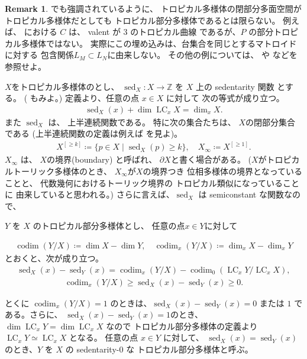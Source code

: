 \documentclass[a4paper,dvipdfmx,reqno,12pt]{amsart}
\theoremstyle{definition}
\newtheorem{remark}[theorem]{Remark}
\newcommand{\deq}{\coloneqq}
\newcommand{\opn}[1]{\operatorname{#1}}
\numberwithin{equation}{section}
\begin{document}
\begin{remark}
\cite[Example 2.15]{demedrano2023chern}でも強調されているように、
トロピカル多様体の閉部分多面空間がトロピカル多様体だとしても
トロピカル部分多様体であるとは限らない。
例えば、
\cite[Example 2.21]{shaw2015tropical}
における $C$ は、 valent が $3$ のトロピカル曲線
であるが、$P$ の部分トロピカル多様体ではない。
実際にこの埋め込みは、台集合を同じとするマトロイドに対する
包含関係$L_M\subset L_N$に由来しない。
その他の例については、
\cite{MR2594592} や \cite{MR3339531}
などを参照せよ。


\end{remark}

$X$をトロピカル多様体のとし、
$\opn{sed}_X\colon 
X\to \mathbb{Z}$ を
$X$ 上の sedentarity 関数
\cite[Definition 7.2.6]{mikhalkin2018tropical}
とする。
(\cite[Definition 2.4]{demedrano2023chern}
もみよ。)
定義より、任意の点 $x\in X$ に対して
次の等式が成り立つ。
\begin{align}
\opn{sed}_X(x)+\dim \opn{LC}_x X=\dim_x X.
\end{align}
また $\opn{sed}_X$ は、
上半連続関数である。
特に次の集合たちは、
$X$の閉部分集合である
(上半連続関数の定義は例えば\cite[p.287]{MR463157}
を見よ)。
\begin{align}
X^{[\geq k]}\deq \{p\in X\mid \opn{sed}_X(p)\geq k\},
\quad 
X_{\infty}\deq X^{[\geq 1]}.
\end{align}
$X_{\infty}$ は、
$X$の境界(boundary)
と呼ばれ、
$\partial X$と書く場合がある。
($X$がトロピカルトーリック多様体のとき、
$X_{\infty}$が$X$の境界つき
位相多様体の境界となっていることと、
代数幾何におけるトーリック境界の
トロピカル類似になっていることに
由来していると思われる。)
さらに言えば、$\opn{sed}_X$ は
semiconstant な関数なので、




$Y$ を $X$ 
のトロピカル部分多様体とし、
任意の点$x\in Y$に対して

\begin{align}
\opn{codim}(Y/X)\deq \dim X -\dim Y,\quad 
\opn{codim}_x(Y/X)\deq \dim_x X -\dim_x Y
\end{align}
とおくと、次が成り立つ。
\begin{align}
\opn{sed}_X(x)-\opn{sed}_Y(x)=
\opn{codim}_x(Y/X)-\opn{codim}_0(\opn{LC}_x Y/\opn{LC}_xX),
\end{align}
\begin{align}
\opn{codim}_x(Y/X) \geq 
\opn{sed}_X(x)-\opn{sed}_Y(x)\geq 0.
\end{align}

とくに $\opn{codim}_x(Y/X)=1$
のときは、$\opn{sed}_X(x)-\opn{sed}_Y(x)=0$ または
$1$ である。さらに、
$\opn{sed}_X(x)-\opn{sed}_Y(x)=1$のとき、
$\dim \opn{LC}_x Y=\dim \opn{LC}_x X$
なので トロピカル部分多様体の定義より
$\opn{LC}_x Y\simeq \opn{LC}_x X$
となる。
任意の点 $x\in Y$ に対して、
$\opn{sed}_X(x)=\opn{sed}_Y(x)$ 
のとき、$Y$ を $X$ の sedentarity-0 な
トロピカル部分多様体と呼ぶ。 
\end{document}
